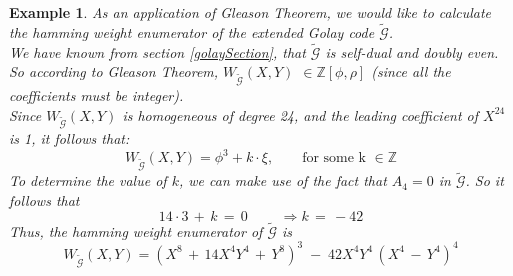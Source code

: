 \documentclass{article}
\newtheorem{example}[theorem]{Example}
\numberwithin{equation}{theorem}
\numberwithin{figure}{theorem}
\newcommand{\cCodes}{\ensuremath{\widetilde{\mathscr{G}}}}
\newcommand{\weightEnumerator}[3]{\ensuremath{W_{#1}(#2,#3)}}
\newcommand{\Integer}{\ensuremath{\mathbb{Z}}}
\begin{document}
\begin{example}\label{golayEnumerExample}
As an application of \emph{Gleason Theorem}, we would like to calculate the \emph{hamming weight enumerator} of the extended Golay code {\cCodes}.\\
We have known from section \ref{golaySection}, that {\cCodes} is self-dual and doubly even. So according to \emph{Gleason Theorem}, {\weightEnumerator{\cCodes}{X}{Y}} $\in \Integer[\phi,\rho]$ (since all the coefficients must be integer).\\
Since {\weightEnumerator{\cCodes}{X}{Y}} is homogeneous of degree 24, and the leading coefficient of $X^24$ is 1, it follows that:
\[
	\weightEnumerator{\cCodes}{X}{Y} = \phi^3 + k \cdot \xi, \quad \quad \mbox{for some k $\in \Integer$}
\]
To determine the value of $k$, we can make use of the fact that $A_4 = 0$ in $\cCodes$. So it follows that 
\[
	14 \cdot 3 \,+\, k \, =\, 0 \qquad \; \Rightarrow k \,=\, -42
\]
Thus, the \emph{hamming weight enumerator} of {\cCodes} is 
\[
	\weightEnumerator{\cCodes}{X}{Y} = (X^8 \,+ \, 14X^4 Y^4 \,+\, Y^8) ^3 \; - \; 42 X^4Y^4 \,(X^4 \, - \, Y^4)^4
\]
\end{example}
\end{document}
